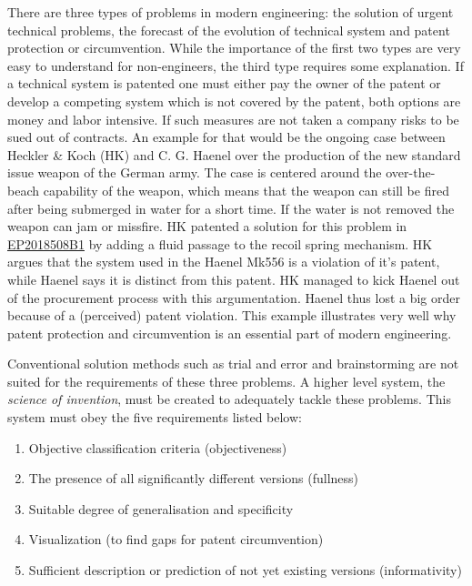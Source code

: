 \documentclass[11pt,a4paper]{article}
\begin{document}
There are three types of problems in modern engineering: the solution of urgent technical problems, the forecast of the evolution of technical system and patent protection or circumvention. While the importance of the first two types are very easy to understand for non-engineers, the third type requires some explanation. If a technical system is patented one must either pay the owner of the patent or develop a competing system which is not covered by the patent, both options are money and labor intensive. If such measures are not taken a company risks to be sued out of contracts. 
An example for that would be the ongoing case between Heckler \& Koch (HK) and C. G. Haenel over the production of the new standard issue weapon of the German army. The case is centered around the over-the-beach capability of the weapon, which means that the weapon can still be fired after being submerged in water for a short time. If the water is not removed the weapon can jam or missfire. HK patented a solution for this problem in \href{https://patents.google.com/patent/EP2018508B1/en}{EP2018508B1} by adding a fluid passage to the recoil spring mechanism. HK argues that the system used in the Haenel Mk556 is a violation of it's patent, while Haenel says it is distinct from this patent. HK managed to kick Haenel out of the procurement process with this argumentation. Haenel thus lost a big order because of a (perceived) patent violation. This example illustrates very well why patent protection and circumvention is an essential part of modern engineering.

Conventional solution methods such as trial and error and brainstorming are not suited for the requirements of these three problems. A higher level system, the \textit{science of invention}, must be created to adequately tackle these problems. This system must obey the five requirements listed below:

\begin{enumerate}
    \item Objective classification criteria (objectiveness)
    \item The presence of all significantly different versions (fullness)
    \item Suitable degree of generalisation and specificity
    \item Visualization (to find gaps for patent circumvention)
    \item Sufficient description or prediction of not yet existing versions (informativity)
\end{enumerate}
\end{document}
